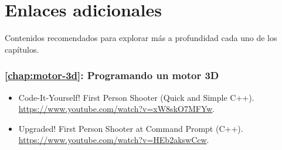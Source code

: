 \chapter{Enlaces adicionales}
\label{chap:enlaces}

Contenidos recomendados para explorar más a profundidad cada uno de los capítulos.

\subsection*{\autoref{chap:motor-3d}: Programando un motor 3D}

\begin{itemize}
\item Code-It-Yourself! First Person Shooter (Quick and Simple C++). \url{https://www.youtube.com/watch?v=xW8skO7MFYw}.

\item Upgraded! First Person Shooter at Command Prompt (C++). \url{https://www.youtube.com/watch?v=HEb2akswCcw}.
\end{itemize}

